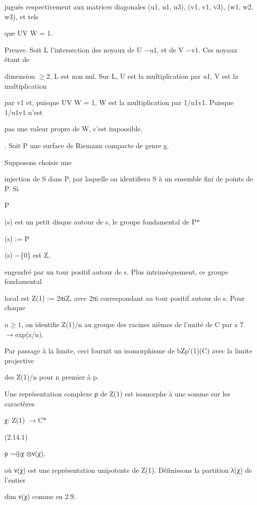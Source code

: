 \documentclass[11pt]{article}
\begin{document}
\noindent jugués respectivement aux matrices diagonales (u1, u1, u3), (v1, v1, v3), (w1, w2, w3), et tels\par
\noindent que UV W = 1.\par
\noindent Preuve. Soit L l’intersection des noyaux de U −u1, et de V −v1. Ces noyaux étant de\par
\noindent dimension \(\geq\)2, L est non nul. Sur L, U est la multiplication par u1, V est la multiplication\par
\noindent par v1 et, puisque UV W = 1, W est la multiplication par 1/u1v1. Puisque 1/u1v1 n’est\par
\noindent pas une valeur propre de W, c’est impossible.\par
{}. Soit P une surface de Riemann compacte de genre g.\par
\noindent Supposons choisie une\par
\noindent injection de S dans P, par laquelle on identifiera S à un ensemble fini de points de P. Si\par
\medskip
\noindent P\par
\noindent (s) est un petit disque autour de s, le groupe fondamental de P\(*\)\par
\noindent (s) := P\par
\noindent (s) −\{0\} est Z,\par
\noindent engendré par un tour positif autour de s. Plus intrinsèquement, ce groupe fondamental\par
\noindent local est Z(1) := 2πiZ, avec 2πi correspondant au tour positif autour de s. Pour chaque\par
\noindent \(n\geq 1\), on identifie Z(1)/n au groupe des racines nièmes de l’unité de C par z 7\(\to\)exp(z/n).\par
\noindent Par passage à la limite, ceci fournit un isomorphisme de bZp′(1)(C) avec la limite projective\par
\noindent des Z(1)/n pour n premier à p.\par
\noindent Une représentation complexe ρ de Z(1) est isomorphe à une somme sur les caractères\par
\noindent χ: Z(1) \(\to\)C\(*\)\par
\noindent (2.14.1)\par
\noindent ρ \(\sim\)\(\oplus\)χ \(\otimes\)ν(χ),\par
\noindent où ν(χ) est une représentation unipotente de Z(1). Définissons la partition λ(χ) de l’entier\par
\noindent dim ν(χ) comme en 2.9.\par
\end{document}
